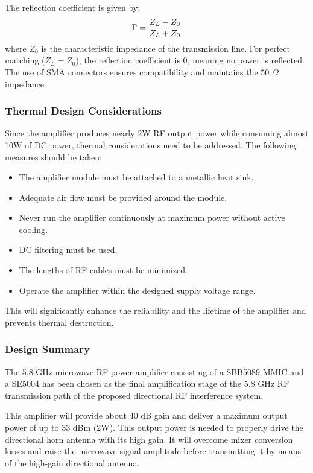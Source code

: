 \documentclass[12pt,a4paper]{report}
\begin{document}
	The reflection coefficient is given by:
	\begingroup
	\setlength{\mathindent}{0pt}
	\begin{equation*}
		\hfill
		\Gamma = \frac{Z_L - Z_0}{Z_L + Z_0}
		\hfill
	\end{equation*}
	\endgroup
	where $Z_0$ is the characteristic impedance of the transmission line. For perfect matching ($Z_L = Z_0$), the reflection coefficient is 0, meaning no power is reflected. The use of SMA connectors ensures compatibility and maintains the 50 $\Omega$ impedance.
	\subsubsection{Thermal Design Considerations}
	Since the amplifier produces nearly 2W RF output power while consuming almost 10W of DC power, thermal considerations need to be addressed. The following measures should be taken:
	\begin{itemize}
		\item The amplifier module must be attached to a metallic heat sink.
		\item Adequate air flow must be provided around the module.
		\item Never run the amplifier continuously at maximum power without active cooling.
		\item DC filtering must be used.
		\item The lengths of RF cables must be minimized.
		\item Operate the amplifier within the designed supply voltage range.
	\end{itemize}
	This will significantly enhance the reliability and the lifetime of the amplifier and prevents thermal destruction.
	\subsubsection{Design Summary}
	The 5.8 GHz microwave RF power amplifier consisting of a SBB5089 MMIC and a SE5004 has been chosen as the final amplification stage of the 5.8 GHz RF transmission path of the proposed directional RF interference system.
	
	This amplifier will provide about 40 dB gain and deliver a maximum output power of up to 33 dBm (2W). This output power is needed to properly drive the directional horn antenna with its high gain. It will overcome mixer conversion losses and raise the microwave signal amplitude before transmitting it by means of the high-gain directional antenna.
	
\end{document}
